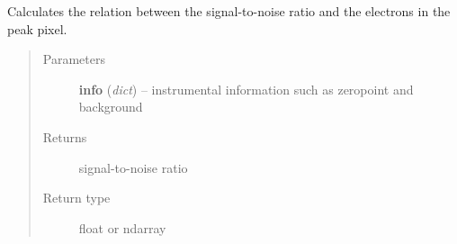 \documentclass[a4paper,12pt,english]{sphinxmanual}
\begin{document}
\begin{fulllineitems}
\label{ETC:analysis.ETC.SNRproptoPeak}
Calculates the relation between the signal-to-noise ratio and the electrons in the peak pixel.
\begin{quote}\begin{description}
\item[{Parameters}] \leavevmode
\textbf{info} (\emph{dict}) -- instrumental information such as zeropoint and background

\item[{Returns}] \leavevmode
signal-to-noise ratio

\item[{Return type}] \leavevmode
float or ndarray

\end{description}\end{quote}

\end{fulllineitems}

\end{document}
